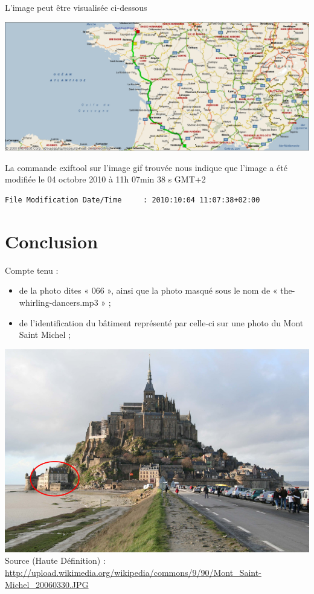 \documentclass[a4paper,11pt]{article}
\begin{document}
L'image peut être visualisée ci-dessous 

\includegraphics[width=\textwidth]{image_map.png}

La commande exiftool sur l'image gif trouvée nous indique que l'image a été modifiée le 04
octobre 2010 à 11h 07min 38 s GMT+2
\begin{verbatim}
File Modification Date/Time     : 2010:10:04 11:07:38+02:00
\end{verbatim}


\section{Conclusion}

Compte tenu :
\begin{itemize}
    \item de la photo dites « 066 », ainsi que la photo masqué sous le nom de
        « the-whirling-dancers.mp3 » ;
    \item de l’identification du bâtiment représenté par celle-ci sur une photo
        du Mont Saint Michel ;
\end{itemize}

\begin{center}
\includegraphics[width=\textwidth]{mont-saint-michel.jpg}
Source (Haute Définition) : \url{http://upload.wikimedia.org/wikipedia/commons/9/90/Mont_Saint-Michel_20060330.JPG}
\end{center}
\end{document}
